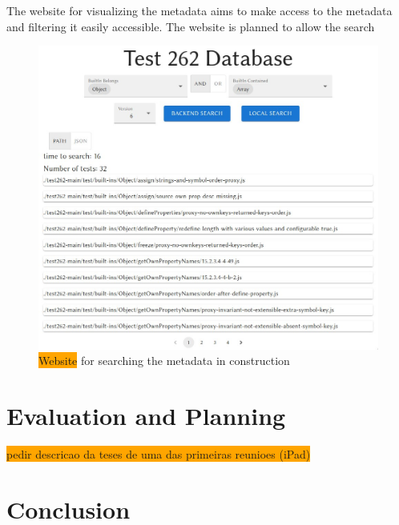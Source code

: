 \documentclass[runningheads]{llncs}
\begin{document}
The website for visualizing the metadata aims to make access to the metadata and filtering it easily accessible. The website is planned to allow the search 



\begin{figure}[ht]
    \centering
    \includegraphics[width=1\textwidth]{images/website.png}
    \caption{\colorbox{orange}{Website} for searching the metadata in construction}
    \label{fig:website}
\end{figure}

\section{Evaluation and Planning}
\label{sec:Evaluation and Planning}
\colorbox{orange}{pedir descricao da teses de uma das primeiras reunioes (iPad)}

\section{Conclusion}
\label{sec:Conclusion}


%
%

%
%
%
% 
% 
%


\end{document}

